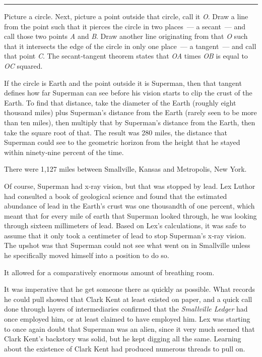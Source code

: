\documentclass[ebook,12pt]{memoir}
\begin{document}
\begin{center}\rule{0.5\linewidth}{0.5pt}\end{center}

Picture a circle. Next, picture a point outside that circle, call it
\emph{O}. Draw a line from the point such that it pierces the circle in
two places~--- a secant~--- and call those two points \emph{A} and
\emph{B}. Draw another line originating from that \emph{O} such that it
intersects the edge of the circle in only one place~--- a tangent~---
and call that point \emph{C}. The secant‐tangent theorem states that
\emph{OA} times \emph{OB} is equal to \emph{OC} squared.

If the circle is Earth and the point outside it is Superman, then that
tangent defines how far Superman can see before his vision starts to
clip the crust of the Earth. To find that distance, take the diameter of
the Earth (roughly eight thousand miles) plus Superman's distance from
the Earth (rarely seen to be more than ten miles), then multiply that by
Superman's distance from the Earth, then take the square root of that.
The result was 280 miles, the distance that Superman could see to the
geometric horizon from the height that he stayed within ninety‐nine
percent of the time.

There were 1,127 miles between Smallville, Kansas and Metropolis, New
York.

Of course, Superman had x‐ray vision, but that was stopped by lead. Lex
Luthor had consulted a book of geological science and found that the
estimated abundance of lead in the Earth's crust was one thousandth of
one percent, which meant that for every mile of earth that Superman
looked through, he was looking through sixteen millimeters of lead.
Based on Lex's calculations, it was safe to assume that it only took a
centimeter of lead to stop Superman's x‐ray vision. The upshot was that
Superman could not see what went on in Smallville unless he specifically
moved himself into a position to do so.

It allowed for a comparatively enormous amount of breathing room.

It was imperative that he get someone there as quickly as possible. What
records he could pull showed that Clark Kent at least existed on paper,
and a quick call done through layers of intermediaries confirmed that
the \emph{Smallville Ledger} had once employed him, or at least claimed
to have employed him. Lex was starting to once again doubt that Superman
was an alien, since it very much seemed that Clark Kent's backstory was
solid, but he kept digging all the same. Learning about the existence of
Clark Kent had produced numerous threads to pull on.
\end{document}
